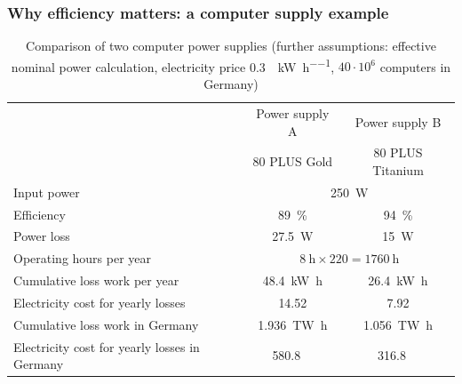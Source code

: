 \begin{frame}[c]
	\frametitle{Why efficiency matters: a computer supply example}
	\begin{table}
		\centering
		\begin{tabular}{lcc}
			\toprule
			                                              & Power supply A                                                           & Power supply B                     \\
			                                              & 80 PLUS Gold                                                             & 80 PLUS Titanium                   \\
			\midrule
			Input power                                   & \multicolumn{2}{c}{\SI{250}{\watt}} \pause                                                                    \\
			Efficiency                                    & \SI{89}{\percent}                                                        & \SI{94}{\percent}  \pause          \\
			Power loss                                    & \SI{27.5}{\watt}                                                         & \SI{15}{\watt} \pause              \\
			\midrule
			Operating hours per year                      & \multicolumn{2}{c}{$\SI{8}{\hour} \times 220 = \SI{1760}{\hour}$} \pause                                      \\
			Cumulative loss work per year                 & \SI{48.4}{\kilo\watt\hour}                                               & \SI{26.4}{\kilo\watt\hour} \pause  \\
			Electricity cost for yearly losses            & \SI{14.52}{\EUR}                                                         & \SI{7.92}{\EUR} \pause             \\
			\midrule
			Cumulative  loss work in Germany              & \SI{1.936}{\tera\watt\hour}                                              & \SI{1.056}{\tera\watt\hour} \pause \\
			Electricity cost for yearly losses in Germany & \SI{580.8}{\mega\EUR}                                                    & \SI{316.8}{\mega\EUR}              \\
			\bottomrule
		\end{tabular}
		\label{tab:efficiency_computer_supply_example}
		\caption{Comparison of two computer power supplies (further assumptions: effective nominal power calculation, electricity price \SI[fraction-function=\nicefrac]{0.3}{\EUR\per\kilo\watt\per\hour}, $40\cdot 10^6$ computers in Germany)}
	\end{table}
\end{frame}


